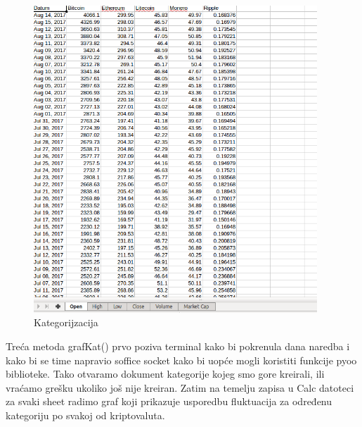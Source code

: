\documentclass[a4paper,12pt]{foi}
\begin{document}
\begin{figure}[h]
\centering 
\includegraphics[width=0.95\textwidth]{kategorije.png}
\caption{Kategorijzacija}
\label{slika-6}
\end{figure}


Treća metoda grafKat() prvo poziva terminal kako bi pokrenula dana naredba i kako bi se time napravio soffice socket kako bi uopće mogli koristiti funkcije pyoo biblioteke. Tako otvaramo dokument kategorije kojeg smo gore kreirali, ili vraćamo grešku ukoliko još nije kreiran. Zatim na temelju zapisa u Calc datoteci za svaki sheet radimo graf koji prikazuje usporedbu fluktuacija za određenu kategoriju po svakoj od kriptovaluta.
\end{document}
